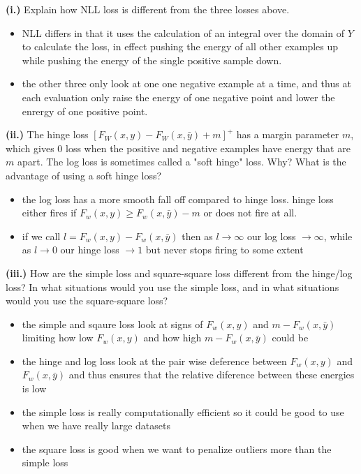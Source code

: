 \documentclass{article}
\begin{document}
\textbf{(i.)} Explain how NLL loss is different from the three losses above. \\
\begin{itemize}
    \color{red}
    \item NLL differs in that it uses the calculation of an integral over the domain of $Y$ to calculate the loss, in effect pushing the energy of all other examples up while pushing the energy of the single positive sample down. 
    \item the other three only look at one one negative example at a time, and thus at each evaluation only raise the energy of one negative point and lower the enrergy of one positive point.
\end{itemize}
\textbf{(ii.)} The hinge loss $[F_W(x, y) - F_W(x, \bar{y}) + m]^{+}$ has a margin parameter $m$, which gives 0 loss when the positive and negative examples have energy that are $m$ apart. The log loss is sometimes called a "soft hinge" loss. Why? What is the advantage of using a soft hinge loss? \\
\begin{itemize}
    \color{red}
    \item the log loss has a more smooth fall off compared to hinge loss. hinge loss either fires if $F_{w}(x,y)\geq F_w(x,\bar{y})-m$ or does not fire at all. 
    \item if we call $l = F_w(x,y)- F_w(x,\bar{y})$ then as $l\rightarrow \infty$ our log loss $\rightarrow \infty$, while as $l\rightarrow 0 $ our hinge loss $\rightarrow 1$  but never stops firing to some extent 
\end{itemize}
\textbf{(iii.)} How are the simple loss and square-square loss different from the hinge/log loss? In what situations would you use the simple loss, and in what situations would you use the square-square loss? \\
\begin{itemize}
    \color{red}
    \item the simple and sqaure loss look at signs of $F_{w}(x,y)$ and $m-F_{w}(x,\bar{y})$ limiting how low $F_{w}(x,y)$ and how high $m-F_{w}(x,\bar{y})$ could be 
    \item the hinge and log loss look at the pair wise deference between $F_{w}(x,y)$ and $F_{w}(x,\bar{y})$ and thus ensures that the relative diference between these energies is low
    \item the simple loss is really computationally efficient so it could be good to use when we have really large datasets
    \item the square loss is good when we want to penalize outliers more than the simple loss
\end{itemize}
\end{document}

